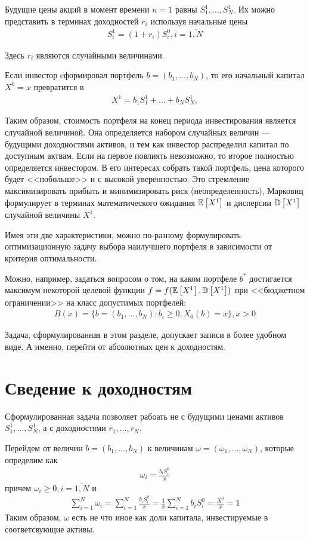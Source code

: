 Будущие цены акций в момент времени $n=1$ равны $S_1^1, \dots, S_N^1$. 
Их можно представить в терминах доходностей $r_i$ используя начальные цены
\begin{align}
	S_i^1 = (1 + r_i) S_i^0, i=\overline{1, N}
\end{align}

Здесь $r_i$ являются случайными величинами.


Если инвестор cформировал портфель $b = (b_1, \dots, b_N )$, то его начальный капитал $X^0 = x$ превратится в 
\begin{align}
	X^1 = b_1 S_1^1 + \dots + b_N S_N^1,
\end{align}

Таким образом, стоимость портфеля на конец периода инвестирования является случайной величиной. 
Она определяется набором случайных величин --- будущими доходностями активов, и тем как инвестор распределил капитал
по доступным актвам. Если на первое повлиять невозможно, то второе полностью определяется инвестором.
В его интересах собрать такой портфель, цена которого будет <<побольше>> и с высокой уверенностью.
Это стремление максимизировать прибыть и минимизировать риск (неопределенность), Марковиц формулирует в терминах
математического ожидания $\mathbb{E}\left[X^1\right]$ и дисперсии $\mathbb{D}\left[X^1\right]$ случайной величины $X^1$.

Имея эти две характеристики, можно по-разному формулировать оптимизационную задачу выбора наилучшего портфеля в
зависимости от критерия оптимальности.

Можно, например, задаться вопросом о том, на каком портфеле $b^*$ достигается максимум некоторой целевой функции 
$f = f(\mathbb{E}\left[X^1\right], \mathbb{D}\left[X^1\right])$ при <<бюджетном ограничении>> на класс допустимых портфелей:
\begin{align}
	B(x) = \{b=(b_1, \dots, b_N): b_i \ge 0, X_0(b) = x\}, x > 0
\end{align}

Задача, сформулированная в этом разделе, допускает записи в более удобном виде. А именно, перейти от абсолютных цен
к доходностям.

\section{Сведение к доходностям}

Сформулированная задача позволяет рабоать не с будущими ценами активов $S_1^1, \dots, S_N^1$,
а с доходностями $r_1, \dots, r_N$.

Перейдем от величин $b = (b_1, \dots, b_N)$ к величинам $\omega = (\omega_1, \dots, \omega_N)$, которые определим как
\begin{align}
	\omega_i = \frac{b_i S_i^0}{x}
\end{align}
причем $\omega_i \ge 0, i=\overline{1, N}$ и
\begin{align}
	\sum_{i=1}^{N} \omega_i 
	= \sum_{i=1}^{N} \frac{b_i S_i^0}{x}
	= \frac{1}{x} \sum_{i=1}^{N} b_i S_i^0
	= \frac{X^0}{x} = 1
\end{align}
Таким образом, $\omega$ есть не что иное как доли капитала, инвестируемые в соответсвующие активы.

